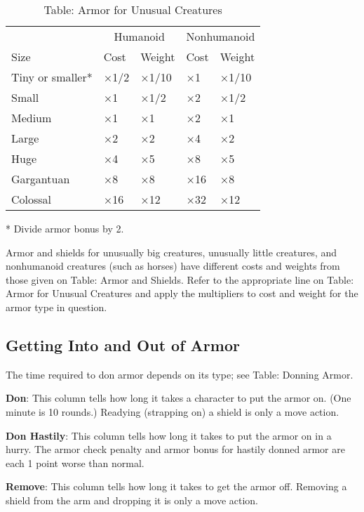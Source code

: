 \begin{table}[]
\sffamily
\caption{Table: Armor for Unusual Creatures}
\begin{tabular}{lllll}
  & \multicolumn{2}{c}{Humanoid} & \multicolumn{2}{c}{Nonhumanoid}\\
Size & Cost & Weight & Cost & Weight\\
Tiny or smaller*& ×1/2& ×1/10& ×1& ×1/10 \\
 Small& ×1& ×1/2& ×2& ×1/2 \\
 Medium& ×1& ×1& ×2& ×1 \\
 Large& ×2& ×2& ×4& ×2 \\
 Huge& ×4& ×5& ×8& ×5 \\
 Gargantuan& ×8& ×8& ×16& ×8 \\
 Colossal& ×16& ×12& ×32& ×12\\
\end{tabular}
* Divide armor bonus by 2.\\
\end{table}
Armor and shields for unusually big creatures, unusually little creatures, and nonhumanoid creatures (such as horses) have different costs and weights from those given on Table: Armor and Shields. Refer to the appropriate line on Table: Armor for Unusual Creatures and apply the multipliers to cost and weight for the armor type in question.

\subsection{Getting Into and Out of Armor}

		
The time required to don armor depends on its type; see Table: Donning Armor.
		
\textbf{Don}: This column tells how long it takes a character to put the armor on. (One minute is 10 rounds.) Readying (strapping on) a shield is only a move action.
		
\textbf{Don Hastily}: This column tells how long it takes to put the armor on in a hurry. The armor check penalty and armor bonus for hastily donned armor are each 1 point worse than normal. 
		
\textbf{Remove}: This column tells how long it takes to get the armor off. Removing a shield from the arm and dropping it is only a move action.

